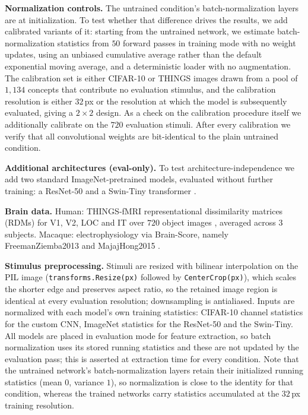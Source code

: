 \documentclass[10pt,twocolumn]{article}
\begin{document}
\textbf{Normalization controls.} The untrained condition's batch-normalization layers are at initialization. To test whether that difference drives the results, we add calibrated variants of it: starting from the untrained network, we estimate batch-normalization statistics from $50$ forward passes in training mode with no weight updates, using an unbiased cumulative average rather than the default exponential moving average, and a deterministic loader with no augmentation. The calibration set is either CIFAR-10 or THINGS images drawn from a pool of $1{,}134$ concepts that contribute no evaluation stimulus, and the calibration resolution is either $32$\,px or the resolution at which the model is subsequently evaluated, giving a $2\times2$ design. As a check on the calibration procedure itself we additionally calibrate on the $720$ evaluation stimuli. After every calibration we verify that all convolutional weights are bit-identical to the plain untrained condition.

\textbf{Additional architectures (eval-only).} To test architecture-independence we add two standard ImageNet-pretrained models, evaluated without further training: a ResNet-50 \citep[torchvision \texttt{IMAGENET1K\_V2};][]{he2016} and a Swin-Tiny transformer \citep[torchvision \texttt{IMAGENET1K\_V1};][]{liu2021}.

\textbf{Brain data.} Human: THINGS-fMRI representational dissimilarity matrices (RDMs) for V1, V2, LOC and IT over $720$ object images \citep{hebart2023}, averaged across $3$ subjects. Macaque: electrophysiology via Brain-Score, namely FreemanZiemba2013 \citep[V1, V2; $135$ texture stimuli;][]{freeman2013} and MajajHong2015 \citep[V4, IT; $3{,}200$ object presentations;][]{majaj2015}.

\textbf{Stimulus preprocessing.} Stimuli are resized with bilinear interpolation on the PIL image (\texttt{transforms.Resize(px)} followed by \texttt{CenterCrop(px)}), which scales the shorter edge and preserves aspect ratio, so the retained image region is identical at every evaluation resolution; downsampling is antialiased. Inputs are normalized with each model's own training statistics: CIFAR-10 channel statistics for the custom CNN, ImageNet statistics for the ResNet-50 and the Swin-Tiny. All models are placed in evaluation mode for feature extraction, so batch normalization uses its stored running statistics and these are not updated by the evaluation pass; this is asserted at extraction time for every condition. Note that the untrained network's batch-normalization layers retain their initialized running statistics (mean $0$, variance $1$), so normalization is close to the identity for that condition, whereas the trained networks carry statistics accumulated at the $32$\,px training resolution.
\end{document}
